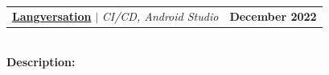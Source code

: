 \documentclass[letterpaper,11pt]{article}
\makeatletter
\newcommand{\resumeItem}[1]{
  \item\small{
    {#1 \vspace{-2pt}}
  }
}
\newcommand{\resumeProjectHeading}[2]{
    \item
    \begin{tabular*}{1.001\textwidth}{l@{\extracolsep{\fill}}r}
      \small#1 & \textbf{\small #2}\\
    \end{tabular*}\vspace{-7pt}
}
\newcommand{\resumeItemListStart}{\begin{itemize}}
\newcommand{\resumeItemListEnd}{\end{itemize}\vspace{-5pt}}
\makeatother
\begin{document}

                
                            

    \resumeProjectHeading          {\textbf{\href{https://github.com/saiyakkshit/Langversation}{Langversation}} $|$ \emph{CI/CD, Android Studio \faGithub}}{December 2022}\\
          \vspace{6pt}
          \textbf{Description:}
         
\end{document}
